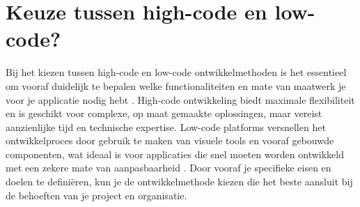 \section{Keuze tussen high-code en low-code?}
Bij het kiezen tussen high-code en low-code ontwikkelmethoden is het essentieel om vooraf duidelijk te bepalen welke functionaliteiten en mate van maatwerk je voor je applicatie nodig hebt \autocite{Ballejos2024}. High-code ontwikkeling biedt maximale flexibiliteit en is geschikt voor complexe, op maat gemaakte oplossingen, maar vereist aanzienlijke tijd en technische expertise. Low-code platforms versnellen het ontwikkelproces door gebruik te maken van visuele tools en vooraf gebouwde componenten, wat ideaal is voor applicaties die snel moeten worden ontwikkeld met een zekere mate van aanpasbaarheid \autocite{Ballejos2024}.  Door vooraf je specifieke eisen en doelen te definiëren, kun je de ontwikkelmethode kiezen die het beste aansluit bij de behoeften van je project en organisatie.


